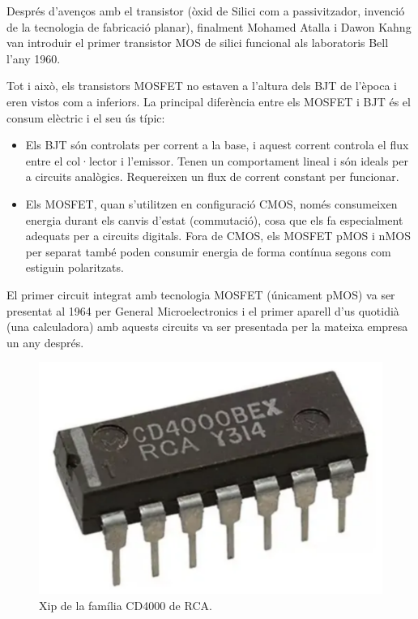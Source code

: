 \documentclass[11pt,a4paper]{article}
\begin{document}
Després d'avenços amb el transistor (òxid de Silici com a passivitzador, invenció de la tecnologia de fabricació planar), finalment Mohamed Atalla i Dawon Kahng van introduir el primer transistor MOS de silici funcional als laboratoris Bell l'any 1960. 

Tot i això, els transistors MOSFET no estaven a l'altura dels BJT de l'època i eren vistos com a inferiors. La principal diferència entre els MOSFET i BJT és el consum elèctric i el seu ús típic: 
\begin{itemize}
    \item Els BJT són controlats per corrent a la base, i aquest corrent controla el flux entre el col·lector i l'emissor. Tenen un comportament lineal i són ideals per a circuits analògics. Requereixen un flux de corrent constant per funcionar.
    \item Els MOSFET, quan s'utilitzen en configuració CMOS, només consumeixen energia durant els canvis d'estat (commutació), cosa que els fa especialment adequats per a circuits digitals. Fora de CMOS, els MOSFET pMOS i nMOS per separat també poden consumir energia de forma contínua segons com estiguin polaritzats.
\end{itemize}


El primer circuit integrat amb tecnologia MOSFET (únicament pMOS) va ser presentat al 1964 per General Microelectronics i el primer aparell d'us quotidià (una calculadora) amb aquests circuits va ser presentada per la mateixa empresa un any després\autocite{general_microelectronics}.
\begin{figure}
    \centering
    \includegraphics[width=\linewidth]{images/rca cd4000 chip.png}
    \caption{Xip de la família CD4000 de RCA.}
    \vspace{-1.3cm}
\end{figure}
\end{document}
